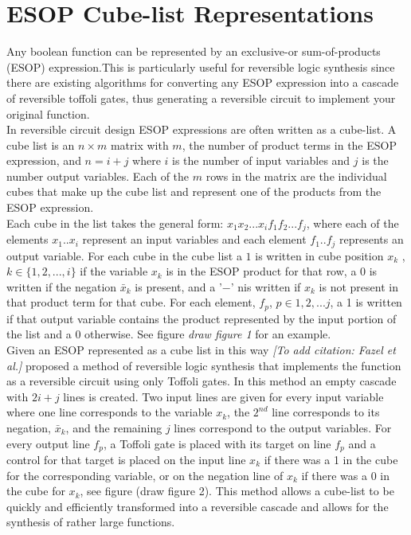 \section{ESOP Cube-list Representations}

Any boolean function can be represented by an exclusive-or sum-of-products (ESOP) expression.This is
particularly useful for reversible logic synthesis since there are existing algorithms for converting 
any ESOP expression into a cascade of reversible toffoli gates, thus generating a reversible circuit 
to implement your original function. \\ 


In reversible circuit design ESOP expressions are often written as a cube-list. A cube list is an $ n \times m $
matrix with $m$, the number of product terms in the ESOP expression, and $n = i + j$ where $i$ is the number 
of input variables and $j$ is the number output variables. Each of the $m$ rows in the matrix are the individual
cubes that make up the cube list and represent one of the products from the ESOP expression. \\

Each cube in the list takes the general form: $x_{1} x_{2} ... x_{i} f_{1} f_{2} ... f_{j}$, where each of the elements $x_{1} .. x_{i}$ 
represent an input variables and each element $f_{1} .. f_{j}$ represents an output variable. For each cube in the 
cube list a $1$ is written in cube position $x_{k}$ , $k \in \{1,2, ..., i\}$ if the variable $x_{k}$ is in 
the ESOP product for that row, a $0$ is written if the negation $\bar{x}_{k}$ is present, and a '$-$' nis written if $x_{k}$ is not present in that
product term for that cube. For each element, $f_{p}$, $p \in {1,2,...j}$, a 1 is written if that output variable contains 
the product represented by the input portion of the list and a 0 otherwise. See figure \emph{draw figure 1} for 
an example. \\

Given an ESOP represented as a cube list in this way \emph{[To add citation: Fazel et al.]} proposed a 
method of reversible logic synthesis that implements the function as a reversible circuit using only 
Toffoli gates. In this method an empty cascade with $2i + j$ lines is created. Two input lines are given for every input 
variable where one line corresponds to the variable $x_{k}$, the $2^{nd}$ line corresponds to its negation, $\bar{x}_{k}$, 
and the remaining $j$ lines correspond to the output variables. For every output line $f_{p}$, a Toffoli gate 
is placed with its target on line $f_{p}$ and a control for that target is placed on the input line $x_{k}$ if there was a 1
in the cube for the corresponding variable, or on the negation line of $x_{k}$ if there was a 0 in the
cube for $x_{k}$, see figure (draw figure 2). This method allows a cube-list to be quickly and efficiently transformed into a reversible cascade and allows for the synthesis of rather large functions. \\


